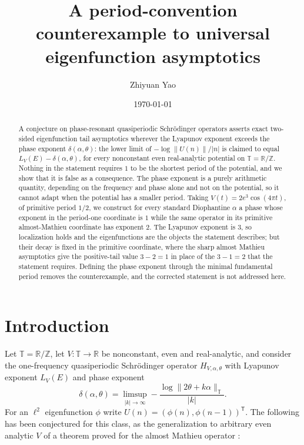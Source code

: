 \documentclass[11pt,reqno]{amsart}
\title[Counterexample to universal eigenfunction asymptotics]{A period-convention counterexample to universal\\eigenfunction asymptotics}
\author{Zhiyuan Yao}
\date{\today}
\theoremstyle{plain}
\theoremstyle{definition}
\theoremstyle{remark}
\numberwithin{equation}{section}
\begin{document}
\begin{abstract}
A conjecture on phase-resonant quasiperiodic Schr\"odinger operators asserts
exact two-sided eigenfunction tail asymptotics wherever the Lyapunov exponent
exceeds the phase exponent $\delta(\alpha,\theta)$: the lower limit of
$-\log\lVert U(n)\rVert/|n|$ is claimed to equal
$L_V(E)-\delta(\alpha,\theta)$, for every nonconstant even real-analytic
potential on $\mathbb T=\mathbb R/\mathbb Z$. Nothing in the statement
requires $1$ to be the shortest period of the potential, and we show that it
is false as a consequence. The phase exponent is a purely arithmetic
quantity, depending on the frequency and phase alone and not on the
potential, so it cannot adapt when the potential has a smaller period. Taking
$V(t)=2e^{3}\cos(4\pi t)$, of primitive period $1/2$, we construct for every
standard Diophantine $\alpha$ a phase whose exponent in the period-one
coordinate is $1$ while the same operator in its primitive almost-Mathieu
coordinate has exponent $2$. The Lyapunov exponent is $3$, so localization
holds and the eigenfunctions are the objects the statement describes; but
their decay is fixed in the primitive coordinate, where the sharp almost
Mathieu asymptotics give the positive-tail value $3-2=1$ in place of the
$3-1=2$ that the statement requires. Defining the phase exponent through the
minimal fundamental period removes the counterexample, and the corrected
statement is not addressed here.
\end{abstract}

\maketitle

\section{Introduction}
\label{sec:intro}

Let $\mathbb T=\mathbb R/\mathbb Z$, let $V:\mathbb T\to\mathbb R$ be
nonconstant, even and real-analytic, and consider the one-frequency
quasiperiodic Schr\"odinger operator $H_{V,\alpha,\theta}$ with Lyapunov
exponent $L_V(E)$ and phase exponent
\begin{equation}
  \label{eq:delta}
  \delta(\alpha,\theta)
  =\limsup_{|k|\to\infty}
   -\frac{\log\lVert2\theta+k\alpha\rVert_{\mathbb T}}{|k|}.
\end{equation}
For an $\ell^2$ eigenfunction $\phi$ write
$U(n)=(\phi(n),\phi(n-1))^{\mathsf T}$. The following has been conjectured
for this class, as the generalization to arbitrary even analytic $V$ of a
theorem proved for the almost Mathieu operator
\cite{Jitomirskaya_2024ur,Jitomirskaya_2023od}:
\end{document}
